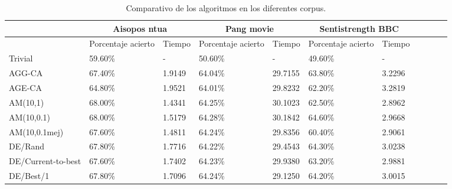 \documentclass{article}
\begin{document}
\begin{table}[H]
	\begin{center}
		\scalebox{0.9} {
			\begin{tabular}{|l|l|l|l|l|l|l|l|l|l|l|}
				\hline
				& \multicolumn{2}{|c|}{Aisopos ntua} & \multicolumn{2}{|c|}{Pang movie} & \multicolumn{2}{|c|}{Sentistrength BBC}\\ \hline
				& Porcentaje acierto &Tiempo & Porcentaje acierto & Tiempo & Porcentaje acierto & Tiempo\\ \hline
				Trivial& 59.60\%& - & 50.60\% &  -& 49.60\% & -\\ \hline
				AGG-CA& 67.40\%& 1.9149 &64.04\%& 29.7155 & 63.80\%& 3.2296\\ \hline
				AGE-CA& 64.80\%& 1.9521 & 64.01\% & 29.8232 & 62.20\% &3.2819\\ \hline
				AM(10,1)& 68.00\%& 1.4341 &  64.25\% & 30.1023 & 62.50\%& 2.8962\\ \hline
				AM(10,0.1)& 68.00\%& 1.5179 &64.28\% & 30.1842 & 64.60\%& 2.9668\\ \hline
				AM(10,0.1mej)& 67.60\%& 1.4811 &64.24\% & 29.8356  & 60.40\%& 2.9061\\ \hline
				DE/Rand& 67.80\%& 1.7716 & 64.22\% & 29.4543  & 64.30\%&3.0238\\ \hline
				DE/Current-to-best& 67.60\%&  1.7402 & 64.23\% & 29.9380 & 63.20\%& 2.9881\\ \hline
				DE/Best/1& 67.80\%& 1.7096 &  64.24\%& 29.1250& 64.20\%& 3.0015\\ \hline
			\end{tabular}
		}\caption{Comparativo de los algoritmos en los diferentes corpus.}
		\label{tabla:corpus1}
	\end{center}
\end{table}
\end{document}
